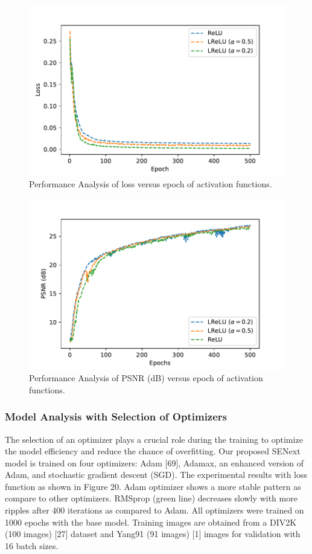 \documentclass{ieeeaccess}
\begin{document}
\begin{figure}[ht]
  \includegraphics[width=\linewidth]{18FIGURE.pdf}
  \caption{Performance Analysis of loss versus epoch of activation functions.}
  \label{fig:17}
\end{figure}


\begin{figure}[ht]
  \includegraphics[width=\linewidth]{19FIGURE.pdf}
  \caption{Performance Analysis of PSNR (dB) versus epoch of activation functions.}
  \label{fig:17}
\end{figure}






\subsubsection{Model Analysis with Selection of Optimizers}
The selection of an optimizer plays a crucial role during the training to optimize the model efficiency and reduce the chance of overfitting. Our proposed SENext model is trained on four optimizers: Adam [69], Adamax, an enhanced version of Adam, and stochastic gradient descent (SGD). The experimental results with loss function as shown in Figure 20. Adam optimizer shows a more stable pattern as compare to other optimizers. RMSprop (green line) decreases slowly with more ripples after 400 iterations as compared to Adam. All optimizers were trained on 1000 epochs with the base model. Training images are obtained from a DIV2K (100 images) [27] dataset and Yang91 (91 images) [1]  images for validation with 16 batch sizes.
\end{document}
